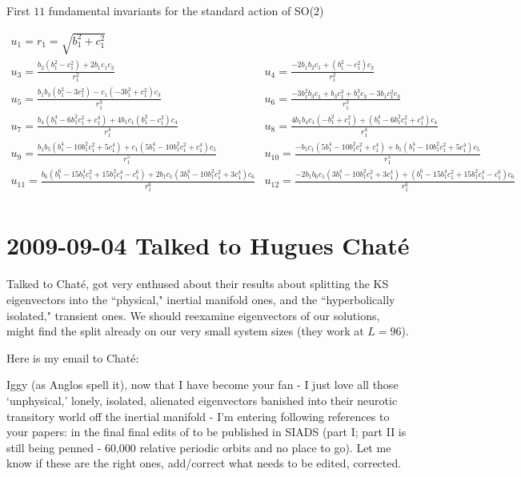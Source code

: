 \begin{table}[t]
\caption
{First $11$ fundamental invariants for the standard action
  of SO(2)}
\scriptsize
\[
\begin{array}{ll}
  u_1=r_1=\sqrt{b_1^2+c_1^2}&  \\ u_3=\frac{b_2 \left(b_1^2-c_1^2\right)+2 b_1 c_1 c_2}{r_1^2}&u_4=\frac{-2
b_1 b_2 c_1+\left(b_1^2-c_1^2\right) c_2}{r_1^2}\\ u_5=\frac{b_1 b_3 \left(b_1^2-3 c_1^2\right)-c_1 \left(-3
b_1^2+c_1^2\right) c_3}{r_1^3}&u_6=\frac{-3 b_1^2 b_3 c_1+b_3 c_1^3+b_1^3 c_3-3 b_1 c_1^2 c_3}{r_1^3}\\ u_7=\frac{b_4
\left(b_1^4-6 b_1^2 c_1^2+c_1^4\right)+4 b_1 c_1 \left(b_1^2-c_1^2\right) c_4}{r_1^4}&u_8=\frac{4 b_1
b_4 c_1 \left(-b_1^2+c_1^2\right)+\left(b_1^4-6 b_1^2 c_1^2+c_1^4\right) c_4}{r_1^4}\\ u_9=\frac{b_1
b_5 \left(b_1^4-10 b_1^2 c_1^2+5 c_1^4\right)+c_1 \left(5 b_1^4-10 b_1^2 c_1^2+c_1^4\right) c_5}{r_1^5}&u_{10}=\frac{-b_5
c_1 \left(5 b_1^4-10 b_1^2 c_1^2+c_1^4\right)+b_1 \left(b_1^4-10 b_1^2 c_1^2+5 c_1^4\right) c_5}{r_1^5}\\ u_{11}=\frac{b_6
\left(b_1^6-15 b_1^4 c_1^2+15 b_1^2 c_1^4-c_1^6\right)+2 b_1 c_1 \left(3 b_1^4-10 b_1^2 c_1^2+3 c_1^4\right) c_6}{r_1^6}&u_{12}=\frac{-2
b_1 b_6 c_1 \left(3 b_1^4-10 b_1^2 c_1^2+3 c_1^4\right)+\left(b_1^6-15 b_1^4 c_1^2+15 b_1^2 c_1^4-c_1^6\right) c_6}{r_1^6}\\
\end{array}
\]
\label{tab:SO2n6}
\end{table}

\section{2009-09-04 Talked to Hugues Chat\'{e}}

 Talked to Chat\'{e}, got very
enthused about their results about splitting the KS
eigenvectors into the ``physical," inertial manifold ones,
and the ``hyperbolically isolated," transient ones. We should
reexamine eigenvectors of our solutions, might find the split
already on our very small system sizes (they work at $L=96$).

Here is my email to Chat\'{e}:

Iggy (as Anglos spell it),
%
now that I have become your fan - I just love all those
`unphysical,' lonely, isolated, alienated eigenvectors
banished into their neurotic transitory world off the
inertial manifold -  I'm entering following references to
your papers:
in the final final edits of to be published in SIADS (part I;
part II is still being penned - 60,000 relative periodic
orbits and no place to go). Let me know if these are the
right ones, add/correct what needs to be edited, corrected.

